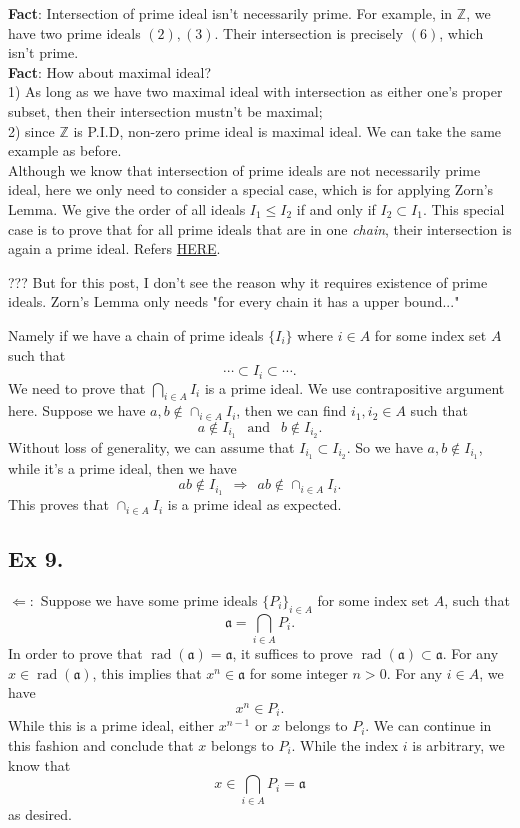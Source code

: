\textbf{Fact}: Intersection of prime ideal isn't necessarily prime. For example, in $\mathbb Z$, we have two prime ideals $(2),(3)$. Their intersection is precisely $(6)$, which isn't prime.\\

\textbf{Fact}: How about maximal ideal?\\ 1) As long as we have two maximal ideal with intersection as either one's proper subset, then their intersection mustn't be maximal;\\ 2) since $\mathbb Z$ is P.I.D, non-zero prime ideal is maximal ideal. We can take the same example as before.\\

Although we know that intersection of prime ideals are not necessarily prime ideal, here we only need to consider a special case, which is for applying Zorn's Lemma. We give the order of all ideals $I_1\leq I_2$ if and only if $I_2\subset I_1$. This special case is to prove that for all prime ideals that are in one \textit{chain}, their intersection is again a prime ideal. Refers \href{https://math.stackexchange.com/questions/944274/intersection-of-prime-ideals-in-a-chain-is-prime}{HERE}.

??? But for this post, I don't see the reason why it requires existence of prime ideals. Zorn's Lemma only needs "for every chain it has a upper bound..."

Namely if we have a chain of prime ideals $\{I_i\}$ where $i\in A$ for some index set $A$ such that 
$$\cdots\subset I_i\subset \cdots.$$ We need to prove that $\bigcap _{i\in A} I_i$ is a prime ideal. 
We use contrapositive argument here. Suppose we have $a,b\notin \cap _{i\in A}I_i$, then we can find $i_1,i_2\in A$ such that 
$$a\notin I_{i_1}~~\text{ and }~~ b\notin I_{i_2}.$$
Without loss of generality, we can assume that $I_{i_1}\subset I_{i_2}$. So we have $a,b\notin I_{i_1}$, while it's a prime ideal, then we have 
$$ab\notin I_{i_1} ~~ \Rightarrow ~~ ab\notin \cap _{i\in A}I_i.$$
This proves that $\cap _{i\in A} I_i$ is a prime ideal as expected.

\newpage\subsection{Ex 9.}

$\Leftarrow:$ Suppose we have some prime ideals $\{P_i\}_{i\in A}$ for some index set $A$, such that 
$$\mathfrak a=\bigcap _{i\in A} P_i.$$
In order to prove that $\operatorname{rad}(\mathfrak a)=\mathfrak a$, it suffices to prove $\operatorname{rad}(\mathfrak a)\subset \mathfrak a$.
For any $x\in \operatorname{rad}(\mathfrak a)$, this implies that $x^n\in\mathfrak a$ for some integer $n>0$. For any $i\in A$, we have 
$$x^n\in P_i.$$
While this is a prime ideal, either $x^{n-1}$ or $x$ belongs to $P_i$. We can continue in this fashion and conclude that $x$ belongs to $P_i$. While the index $i$ is arbitrary, we know that $$x\in \bigcap _{i\in A}P_i=\mathfrak a$$ as desired.\\

